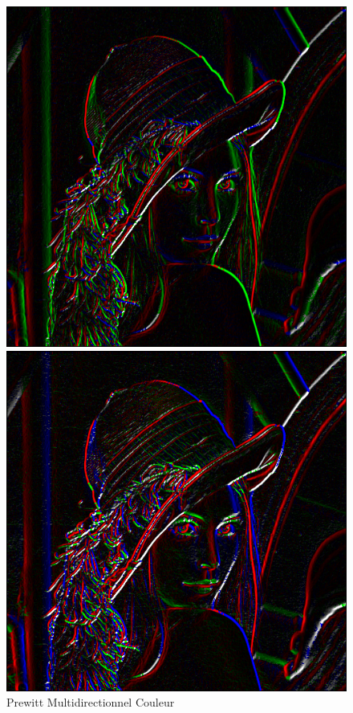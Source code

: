 \documentclass[11pt]{article}
\begin{document}
	\begin{figure}[H]
		\begin{minipage}[c]{.3\linewidth}
			\centering
			\includegraphics[scale=0.25]{Image/filtreMultidirectionnelPrewittCouleur.png}
			\caption{Prewitt Multidirectionnel Couleur}
			\label{fig:PrewittMultidirectionnelCouleur }
		\end{minipage} \hfill
		\begin{minipage}[c]{.3\linewidth}
		\centering
			\includegraphics[scale=0.25]{Image/filtreMultidirectionnelSobelCouleur.png}

\end{minipage}
\end{figure}
\end{document}
